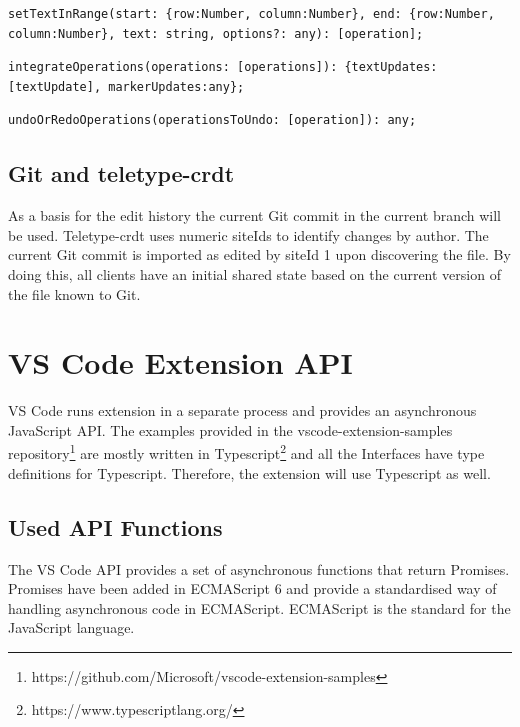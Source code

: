 \begin{lstlisting}[label={lst:setTextInRange}, caption=teletype-crdt setTextInRange]
setTextInRange(start: {row:Number, column:Number}, end: {row:Number, column:Number}, text: string, options?: any): [operation];
\end{lstlisting}

\begin{lstlisting}[label={lst:integrateOperations}, caption=teletype-crdt integrateOperations]
integrateOperations(operations: [operations]): {textUpdates:[textUpdate], markerUpdates:any};
\end{lstlisting}

\begin{lstlisting}[label={lst:undoOrRedoOperations}, caption=teletype-crdt undoOrRedoOperations]
undoOrRedoOperations(operationsToUndo: [operation]): any;
\end{lstlisting}

\subsection{Git and teletype-crdt}
As a basis for the edit history  the current Git commit in the current branch will be used. Teletype-crdt uses numeric siteIds to identify changes by author. The current Git commit is imported as edited by siteId 1 upon discovering the file. By doing this, all clients have an initial shared state based on the current version of the file known to Git.

\section{VS Code Extension API}

VS Code runs extension in a separate process and provides an asynchronous JavaScript API.
The examples provided in the vscode-extension-samples repository\footnote{https://github.com/Microsoft/vscode-extension-samples} are mostly written in Typescript\footnote{https://www.typescriptlang.org/} and all the Interfaces have type definitions for Typescript.
Therefore, the extension will use Typescript as well.

\subsection{Used API Functions}

The VS Code API provides a set of asynchronous functions that return Promises. Promises have been added in ECMAScript 6 and provide a standardised way of handling asynchronous code in ECMAScript. \cite{Madsen:2017:MRJ:3152284.3133910} ECMAScript is the standard for the JavaScript language.


